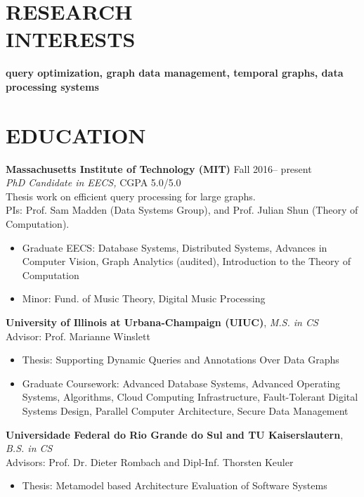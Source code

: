 \documentclass[centered,overlapped]{res}
\begin{document}

\address{jmf@csail.mit.edu, \url{http://joana.fyi}}

\begin{resume}

\section{RESEARCH \\ INTERESTS} \textbf{query optimization, graph data management, temporal graphs, data processing systems}

\section{EDUCATION} \textbf{Massachusetts Institute of Technology (MIT)} \hfill Fall 2016-- present \\
  {\sl PhD Candidate in EECS,} CGPA 5.0/5.0 \\
  Thesis work on efficient query processing for large graphs.\\
  PIs: Prof. Sam Madden (Data Systems Group), and Prof. Julian Shun (Theory of Computation).
  \begin{itemize}  \itemsep -2pt
  \item Graduate EECS: Database Systems, Distributed Systems, Advances in Computer Vision, Graph Analytics (audited), Introduction to the Theory of Computation
  \item Minor: Fund. of Music Theory, Digital Music Processing
  \end{itemize}

  \textbf{University of Illinois at Urbana-Champaign (UIUC)}, {\sl M.S. in CS} \\ %
  Advisor: Prof. Marianne Winslett
  \begin{itemize}  \itemsep -2pt
  \item Thesis: Supporting Dynamic Queries and Annotations Over Data Graphs
  \item Graduate Coursework: Advanced Database Systems, Advanced Operating Systems, Algorithms, Cloud Computing Infrastructure, Fault-Tolerant Digital Systems Design, Parallel Computer Architecture, Secure Data Management
  \end{itemize}

  \textbf{Universidade Federal do Rio Grande do Sul and TU Kaiserslautern}, {\sl B.S. in CS} \\ %
  Advisors: Prof. Dr. Dieter Rombach and Dipl-Inf. Thorsten Keuler
  \begin{itemize}  \itemsep -2pt
  \item Thesis: Metamodel based Architecture Evaluation of Software Systems
  \end{itemize}


\end{resume}
\end{document}
